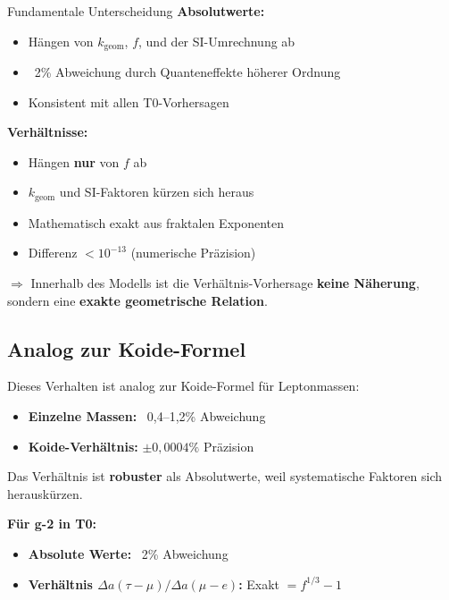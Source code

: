 	\begin{important}{Fundamentale Unterscheidung}
		\textbf{Absolutwerte:}
		\begin{itemize}
			\item Hängen von $k_{\text{geom}}$, $f$, und der SI-Umrechnung ab
			\item ~2\% Abweichung durch Quanteneffekte höherer Ordnung
			\item Konsistent mit allen T0-Vorhersagen
		\end{itemize}
		
		\textbf{Verhältnisse:}
		\begin{itemize}
			\item Hängen \textbf{nur} von $f$ ab
			\item $k_{\text{geom}}$ und SI-Faktoren kürzen sich heraus
			\item Mathematisch exakt aus fraktalen Exponenten
			\item Differenz $< 10^{-13}$ (numerische Präzision)
		\end{itemize}
		
		$\Rightarrow$ Innerhalb des Modells ist die Verhältnis-Vorhersage \textbf{keine Näherung}, sondern eine \textbf{exakte geometrische Relation}.
	\end{important}
	
	\subsection{Analog zur Koide-Formel}
	
	Dieses Verhalten ist analog zur Koide-Formel für Leptonmassen:
	
	\begin{itemize}
		\item \textbf{Einzelne Massen:} ~0{,}4--1{,}2\% Abweichung
		\item \textbf{Koide-Verhältnis:} $\pm 0{,}0004\%$ Präzision
	\end{itemize}
	
	Das Verhältnis ist \textbf{robuster} als Absolutwerte, weil systematische Faktoren sich herauskürzen.
	
	\textbf{Für g-2 in T0:}
	\begin{itemize}
		\item \textbf{Absolute Werte:} ~2\% Abweichung
		\item \textbf{Verhältnis $\Delta a(\tau-\mu)/\Delta a(\mu-e)$:} Exakt $= f^{1/3} - 1$
	\end{itemize}
	
